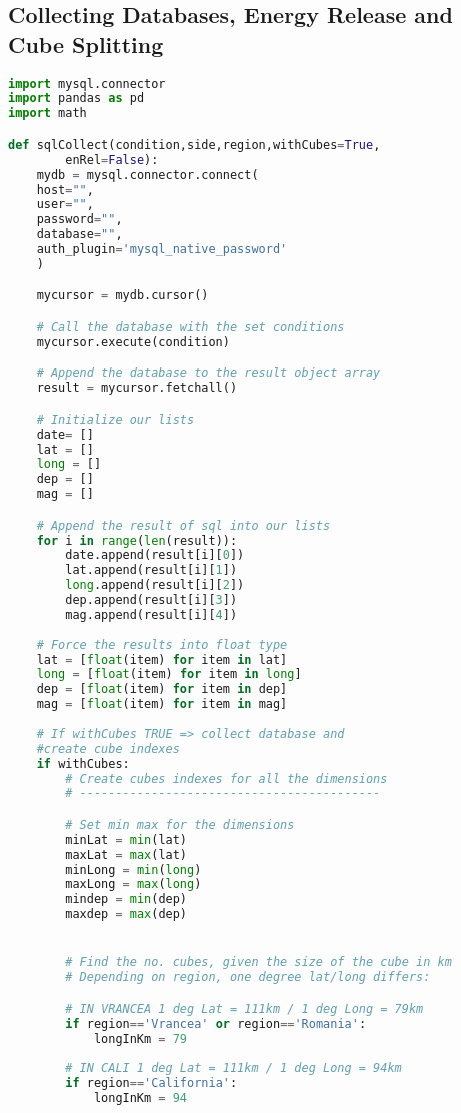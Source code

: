 \documentclass[12pt, twoside]{report}
\begin{document}
{\pagestyle{empty}\cleardoublepage}
\begin{appendices}
\chapter{Collecting Databases, Energy Release and Cube Splitting}

\begin{lstlisting}[language=python, frame=single, tabsize=1]  % Start your code-block
import mysql.connector
import pandas as pd
import math

def sqlCollect(condition,side,region,withCubes=True,
		enRel=False):
	mydb = mysql.connector.connect(
	host="",
	user="",
	password="",
	database="",
	auth_plugin='mysql_native_password'
	)

	mycursor = mydb.cursor()

	# Call the database with the set conditions
	mycursor.execute(condition)

	# Append the database to the result object array
	result = mycursor.fetchall()

	# Initialize our lists    
	date= []
	lat = []
	long = []
	dep = []
	mag = []

	# Append the result of sql into our lists
	for i in range(len(result)):
		date.append(result[i][0])
		lat.append(result[i][1])
		long.append(result[i][2])
		dep.append(result[i][3])
		mag.append(result[i][4])
	  
	# Force the results into float type
	lat = [float(item) for item in lat]
	long = [float(item) for item in long]
	dep = [float(item) for item in dep]
	mag = [float(item) for item in mag]
	
	# If withCubes TRUE => collect database and 
	#create cube indexes
	if withCubes:
		# Create cubes indexes for all the dimensions
		# ------------------------------------------

		# Set min max for the dimensions
		minLat = min(lat)
		maxLat = max(lat)
		minLong = min(long)
		maxLong = max(long)
		mindep = min(dep)
		maxdep = max(dep)


		# Find the no. cubes, given the size of the cube in km 
		# Depending on region, one degree lat/long differs:

		# IN VRANCEA 1 deg Lat = 111km / 1 deg Long = 79km
		if region=='Vrancea' or region=='Romania':
			longInKm = 79
		
		# IN CALI 1 deg Lat = 111km / 1 deg Long = 94km
		if region=='California':
			longInKm = 94


\end{lstlisting}
\end{appendices}
\end{document}
